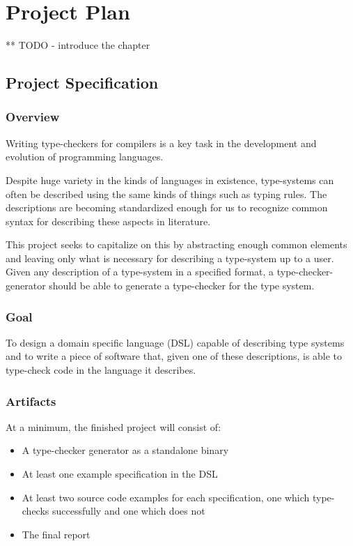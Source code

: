 \chapter{Project Plan}

** TODO - introduce the chapter

\section{Project Specification}

  \subsection{Overview}

  Writing type-checkers for compilers is a key task in the
  development and evolution of programming languages.

  Despite huge variety in the kinds of languages in existence,
  type-systems can often be described using the same kinds of
  things such as typing rules. The descriptions are becoming
  standardized enough for us to recognize common syntax for
  describing these aspects in literature.

  This project seeks to capitalize on this by abstracting
  enough common elements and leaving only what is necessary
  for describing a type-system up to a user. Given any
  description of a type-system in a specified format, a
  type-checker-generator should be able to generate a
  type-checker for the type system.
  
  \subsection{Goal}

  To design a domain specific language (DSL) capable of describing type systems and to
  write a piece of software that, given one of these
  descriptions, is able to type-check code in the language
  it describes.

  \subsection{Artifacts}

  At a minimum, the finished project will consist of:

  \begin{itemize}
  \item A type-checker generator as a standalone binary
  \item At least one example specification in the DSL
  \item At least two source code examples for each
    specification, one which type-checks successfully and one
    which does not
  \item The final report
  \end{itemize}
  
